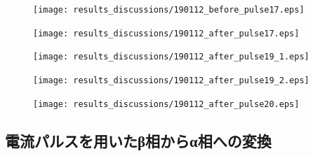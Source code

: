 \begin{figure}[htbp]
 \begin{minipage}{0.5\hsize}
  \begin{center}
   \texttt{[image: results\_discussions/190112\_before\_pulse17.eps]}
  \end{center}
  \caption{}
  \label{fig:one}
 \end{minipage}
 \begin{minipage}{0.5\hsize}
  \begin{center}
   \texttt{[image: results\_discussions/190112\_after\_pulse17.eps]}
  \end{center}
  \caption{}
  \label{fig:two}
 \end{minipage}
  \begin{minipage}{0.5\hsize}
  \begin{center}
   \texttt{[image: results\_discussions/190112\_after\_pulse19\_1.eps]}
  \end{center}
  \caption{}
  \label{fig:two}
 \end{minipage}
  \begin{minipage}{0.5\hsize}
  \begin{center}
   \texttt{[image: results\_discussions/190112\_after\_pulse19\_2.eps]}
  \end{center}
  \caption{}
  \label{fig:two}
 \end{minipage}
  \begin{minipage}{0.5\hsize}
  \begin{center}
   \texttt{[image: results\_discussions/190112\_after\_pulse20.eps]}
  \end{center}
  \caption{}
  \label{fig:two}
 \end{minipage}
\end{figure}

\subsection{電流パルスを用いたβ相からα相への変換}

\newpage

